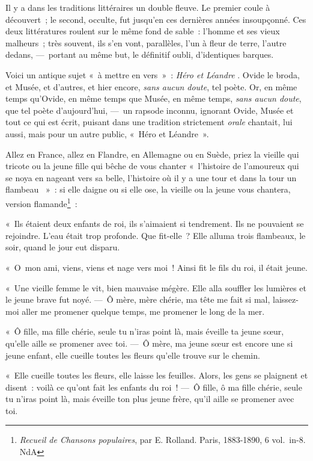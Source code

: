 \documentclass[french,twoside]{book} %
\newcommand\chaptercont{} %
\begin{document}
\chaptercont
\noindent Il y a dans les traditions littéraires un double fleuve. Le premier coule à découvert ; le second, occulte, fut jusqu’en ces dernières années insoupçonné. Ces deux littératures roulent sur le même fond de sable : l’homme et ses vieux malheurs ; très souvent, ils s’en vont, parallèles, l’un à fleur de terre, l’autre dedans, — portant au même but, le définitif oubli, d’identiques barques.\par
Voici un antique sujet « à mettre en vers » : {\itshape Héro et Léandre} . Ovide le broda, et Musée, et d’autres, et hier encore, {\itshape sans aucun doute}, tel poète. Or, en même temps qu’Ovide, en même temps que Musée, en même temps, {\itshape sans aucun doute}, que tel poète d’aujourd’hui, — un rapsode inconnu, ignorant Ovide, Musée et tout ce qui est écrit, puisant dans une tradition strictement {\itshape orale} chantait, lui aussi, mais pour un autre public, « Héro et Léandre ».\par
Allez en France, allez en Flandre, en Allemagne ou en Suède, priez la vieille qui tricote ou la jeune fille qui bêche de vous chanter « l’histoire de l’amoureux qui se noya en nageant vers sa belle, l’histoire où il y a une tour et dans la tour un flambeau  » : si elle daigne ou si elle ose, la vieille ou la jeune vous chantera, version flamande\footnote{ {\itshape Recueil de Chansons populaires}, par E. Rolland. Paris, 1883-1890, 6 vol. in-8. NdA} :\par
« Ils étaient deux enfants de roi, ils s’aimaient si tendrement. Ils ne pouvaient se rejoindre. L’eau était trop profonde. Que fit-elle ? Elle alluma trois flambeaux, le soir, quand le jour eut disparu.\par
« O mon ami, viens, viens et nage vers moi ! Ainsi fit le fils du roi, il était jeune.\par
« Une vieille femme le vit, bien mauvaise mégère. Elle alla souffler les lumières et le jeune brave fut noyé. — Ô mère, mère chérie, ma tête me fait si mal, laissez-moi aller me promener quelque temps, me promener le long de la mer.\par
« Ô fille, ma fille chérie, seule tu n’iras point là, mais éveille ta jeune sœur, qu’elle aille se promener avec toi. — Ô mère, ma jeune sœur est encore une si jeune enfant, elle cueille toutes les fleurs qu’elle trouve sur le chemin.\par
« Elle cueille toutes les fleurs, elle laisse les feuilles. Alors, les gens se plaignent et disent : voilà ce qu’ont fait les enfants du roi ! — Ô fille, ô ma fille chérie, seule tu n’iras point là, mais éveille ton plus jeune frère, qu’il aille se promener avec toi.\par
\end{document}
